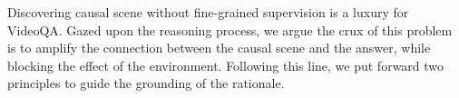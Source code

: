 %


%
Discovering causal scene without fine-grained supervision is a luxury for VideoQA. Gazed upon the reasoning process, we argue the crux of this problem is to amplify the connection between the causal scene and the answer, while blocking the effect of the environment. 
%
Following this line, we put forward two principles to guide the grounding of the rationale.
%
%
